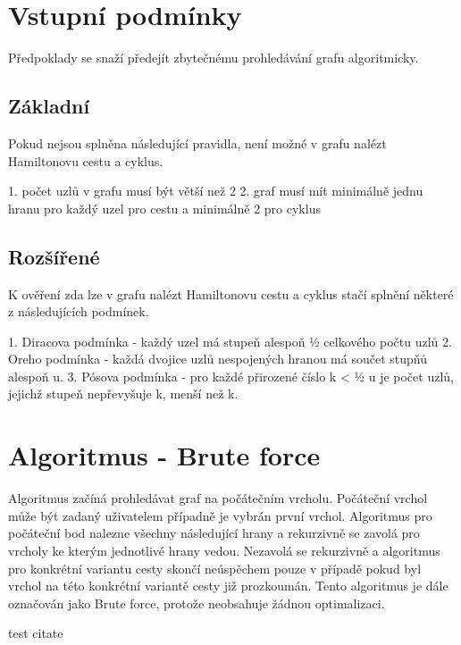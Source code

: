 \documentclass[a4paper,11pt]{article}
\begin{document}
\section{Vstupní podmínky}

Předpoklady se snaží předejít zbytečnému prohledávání grafu algoritmicky. 

\subsection{Základní}

Pokud nejsou splněna následující pravidla, není možné v grafu nalézt Hamiltonovu cestu a cyklus.

1. počet uzlů v grafu musí být větší než 2
2. graf musí mít minimálně jednu hranu pro každý uzel pro cestu a minimálně 2 pro cyklus

\subsection{Rozšířené}

K ověření zda lze v grafu nalézt Hamiltonovu cestu a cyklus stačí splnění některé z následujících podmínek.

1. Diracova podmínka - každý uzel má stupeň alespoň ½ celkového počtu uzlů
2. Oreho podmínka - každá dvojice uzlů nespojených hranou má součet stupňů alespoň u.
3. Pósova podmínka - pro každé přirozené číslo k < ½ u je počet uzlů, jejichž stupeň nepřevyšuje k, menší než k.

\section{Algoritmus - Brute force}

Algoritmus začíná prohledávat graf na počátečním vrcholu. Počáteční vrchol může být zadaný uživatelem případně je vybrán první vrchol. Algoritmus pro počáteční bod nalezne všechny následující hrany a rekurzivně se zavolá pro vrcholy ke kterým jednotlivé hrany vedou. Nezavolá se rekurzivně a algoritmus pro konkrétní variantu cesty skončí neúspěchem pouze v případě pokud byl vrchol na této konkrétní variantě cesty již prozkoumán. Tento algoritmus je dále označován jako Brute force, protože neobsahuje žádnou optimalizaci.

test citate \cite{test_citate}

\end{document}
